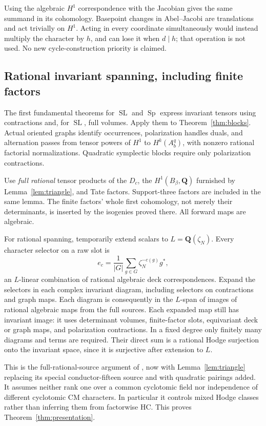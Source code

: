 \documentclass[11pt]{article}
\theoremstyle{remark}\newtheorem{remark}[theorem]{Remark}
\newcommand{\Q}{\mathbf Q}\newcommand{\C}{\mathbf C}
\DeclareMathOperator{\SL}{SL}\DeclareMathOperator{\Sp}{Sp}
\begin{document}
Using the algebraic $H^1$ correspondence with the Jacobian gives the same
summand in its cohomology. Basepoint changes in Abel--Jacobi are translations
and act trivially on $H^1$. Acting in every coordinate simultaneously would
instead multiply the character by $h$, and can lose it when $d\mid h$;
that operation is not used. No new cycle-construction priority is claimed.

\subsection{Rational invariant spanning, including finite factors}
The first fundamental theorems for $\SL$ and $\Sp$ express invariant
tensors using contractions and, for $\SL$, full volumes. Apply them to
Theorem~\ref{thm:blocks}. Actual oriented graphs identify occurrences,
polarization handles duals, and alternation passes from tensor powers of
$H^1$ to $H^k(A_b^q)$, with nonzero rational factorial normalizations.
Quadratic symplectic blocks require only polarization contractions.

Use \emph{full rational} tensor products of the $D_c$, the
$H^1(B_\beta,\Q)$ furnished by Lemma~\ref{lem:triangle}, and Tate factors.
Support-three factors are included in the same lemma. The finite factors'
whole first cohomology, not merely their determinants, is inserted by the
isogenies proved there. All forward maps are algebraic.

For rational spanning, temporarily extend scalars to $L=\Q(\zeta_N)$.
Every character selector on a raw slot is
\[
 e_c=\frac1{|G|}\sum_{g\in G}\zeta_N^{-c(g)}g^*,
\]
an $L$-linear combination of rational algebraic deck correspondences.
Expand the selectors in each complex invariant diagram, including
selectors on contractions and graph maps. Each diagram is consequently
in the $L$-span of images of rational algebraic maps from the full sources.
Each expanded map still has invariant image: it uses determinant volumes,
finite-factor slots, equivariant deck or graph maps, and polarization
contractions. In a fixed degree only finitely many diagrams and terms
are required. Their direct sum is a rational Hodge surjection onto the
invariant space, since it is surjective after extension to $L$.

This is the full-rational-source argument of
\cite[Section 7]{Structural}, now with Lemma~\ref{lem:triangle} replacing
its special conductor-fifteen source and with quadratic pairings added.
It assumes neither rank one over a common cyclotomic field nor independence
of different cyclotomic CM characters. In particular it controls mixed
Hodge classes rather than inferring them from factorwise HC. This proves
Theorem~\ref{thm:presentation}.
\end{document}
